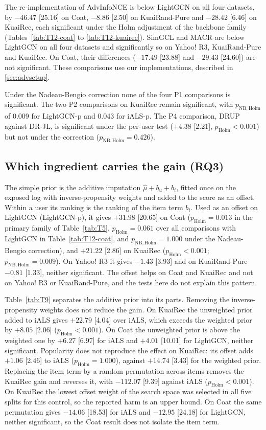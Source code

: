 The re-implementation of AdvInfoNCE is below LightGCN on all four datasets, by $-46.47$ [25.16] on Coat, $-8.86$ [2.50]
on KuaiRand-Pure and $-28.42$ [6.46] on KuaiRec, each significant under the Holm adjustment of the backbone family
(Tables~\ref{tab:T12-coat} to \ref{tab:T12-kuairec}). SimGCL and MACR are below LightGCN on all four datasets and
significantly so on Yahoo! R3, KuaiRand-Pure and KuaiRec. On Coat, their differences ($-17.49$ [23.88] and $-29.43$
[24.60]) are not significant. These comparisons use our implementations, described in \ref{sec:advsetup}.

Under the Nadeau-Bengio correction none of the four P1 comparisons is significant. The two P2 comparisons on KuaiRec
remain significant, with $p_\mathrm{NB,Holm}$ of 0.009 for LightGCN-p and 0.043 for iALS-p. The P4 comparison, DRUP
against DR-JL, is significant under the per-user test ($+4.38$ [2.21], $p_\mathrm{Holm}<0.001$) but not under the
correction ($p_\mathrm{NB,Holm}=0.426$).

\subsection{Which ingredient carries the gain (RQ3)}\label{sec:res-ingredient}

The simple prior is the additive imputation $\hat\mu+b_u+b_i$, fitted once on the exposed log with inverse-propensity
weights and added to the score as an offset. Within a user its ranking is the ranking of the item term $b_i$. Used as an
offset on LightGCN (LightGCN-p), it gives $+31.98$ [20.65] on Coat ($p_\mathrm{Holm}=0.013$ in the primary family of
Table~\ref{tab:T5}, $p_\mathrm{Holm}=0.061$ over all comparisons with LightGCN in Table~\ref{tab:T12-coat}, and
$p_\mathrm{NB,Holm}=1.000$ under the Nadeau-Bengio correction), and $+21.22$ [2.86] on KuaiRec ($p_\mathrm{Holm}<0.001$;
$p_\mathrm{NB,Holm}=0.009$). On Yahoo! R3 it gives $-1.43$ [3.93] and on KuaiRand-Pure $-0.81$ [1.33], neither
significant. The offset helps on Coat and KuaiRec and not on Yahoo! R3 or KuaiRand-Pure, and the tests here do not
explain this pattern.

Table~\ref{tab:T9} separates the additive prior into its parts. Removing the inverse-propensity weights does not reduce
the gain. On KuaiRec the unweighted prior added to iALS gives $+22.79$ [4.04] over iALS, which exceeds the weighted prior
by $+8.05$ [2.06] ($p_\mathrm{Holm}<0.001$). On Coat the unweighted prior is above the weighted one by $+6.27$ [6.97] for
iALS and $+4.01$ [10.01] for LightGCN, neither significant. Popularity does not reproduce the effect on KuaiRec: its
offset adds $+1.06$ [2.46] to iALS ($p_\mathrm{Holm}=1.000$), against $+14.74$ [3.43] for the weighted prior. Replacing
the item term by a random permutation across items removes the KuaiRec gain and reverses it, with $-112.07$ [9.39]
against iALS ($p_\mathrm{Holm}<0.001$). On KuaiRec the lowest offset weight of the search space was selected in all five
splits for this control, so the reported harm is an upper bound. On Coat the same permutation gives $-14.06$ [18.53] for
iALS and $-12.95$ [24.18] for LightGCN, neither significant, so the Coat result does not isolate the item term.

